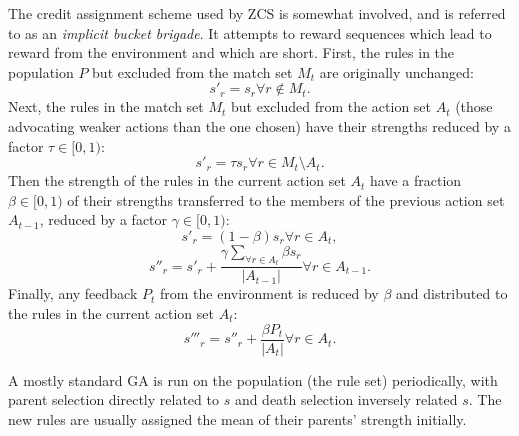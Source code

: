 The credit assignment scheme used by ZCS is somewhat involved, and is referred to as an \emph{implicit bucket brigade}.
It attempts to reward sequences which lead to reward from the environment and which are short.
First, the rules in the population $P$ but excluded from the match set $M_t$ are originally unchanged:
\begin{equation}
s'_r = s_r \forall r \notin M_t.
\end{equation}
Next, the rules in the match set $M_t$ but excluded from the action set $A_t$
(those advocating weaker actions than the one chosen)
have their strengths reduced by a factor $\tau \in [0,1)$:
\begin{equation}
s'_r = \tau s_r \forall r \in M_t \setminus A_t.
\end{equation}
Then the strength of the rules in the current action set $A_t$ have a fraction
$\beta \in [0,1)$
of their strengths transferred to the members of the previous action set $A_{t-1}$,
reduced by a factor $\gamma \in [0,1)$:
\begin{equation}
s'_r = (1-\beta) s_r \forall r \in A_t,
\end{equation}
\begin{equation}
   s''_r = s'_r +
   \frac{\gamma \sum_{\forall r \in A_t} \beta s_r}{|A_{t-1}|}
   \forall r \in A_{t-1}.
\end{equation}
Finally, any feedback $P_t$ from the environment is reduced by $\beta$ and distributed to the rules in the current action set $A_t$:
\begin{equation}
s'''_r = s''_r + \frac{\beta P_t}{|A_t|} \forall r \in A_t.
\end{equation}

A mostly standard GA is run on the population (the rule set) periodically, with parent selection directly related to $s$ and death selection inversely related $s$.
The new rules are usually assigned the mean of their parents' strength initially.
